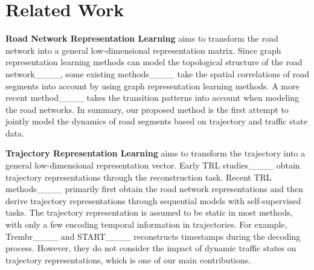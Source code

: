 \section{Related Work}
\textbf{Road Network Representation Learning} aims to transform the road network into a general low-dimensional representation matrix. Since graph representation learning methods can model the topological structure of the road network____, some existing methods____ take the spatial correlations of road segments into account by using graph representation learning methods. 
A more recent method____ takes the transition patterns into account when modeling the road networks. In summary, our proposed method is the first attempt to jointly model the dynamics of road segments based on trajectory and traffic state data.


\textbf{Trajectory Representation Learning} aims to transform the trajectory into a general low-dimensional representation vector. Early TRL studies____ obtain trajectory representations through the reconstruction task. Recent TRL methods____ primarily first obtain the road network representations and then derive trajectory representations through sequential models with self-supervised tasks. The trajectory representation is assumed to be static in most methods, with only a few encoding temporal information in trajectories. For example, Trembr____ and START____ reconstructs timestamps during the decoding process. However, they do not consider the impact of dynamic traffic states on trajectory representations, which is one of our main contributions.